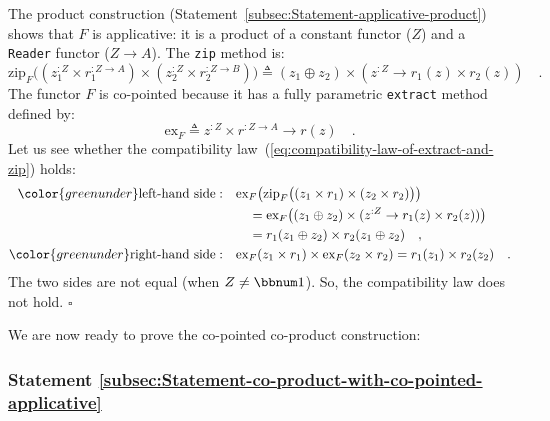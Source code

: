 The product construction (Statement~\ref{subsec:Statement-applicative-product})
shows that $F$ is applicative: it is a product of a constant functor
($Z$) and a \lstinline!Reader! functor ($Z\rightarrow A$). The
\lstinline!zip! method is:
\[
\text{zip}_{F}\big((z_{1}^{:Z}\times r_{1}^{:Z\rightarrow A})\times(z_{2}^{:Z}\times r_{2}^{:Z\rightarrow B})\big)\triangleq(z_{1}\oplus z_{2})\times(z^{:Z}\rightarrow r_{1}(z)\times r_{2}(z))\quad.
\]
 The functor $F$ is co-pointed because it has a fully parametric
\lstinline!extract! method defined by: 
\[
\text{ex}_{F}\triangleq z^{:Z}\times r^{:Z\rightarrow A}\rightarrow r(z)\quad.
\]
Let us see whether the compatibility law~(\ref{eq:compatibility-law-of-extract-and-zip})
holds:
\begin{align*}
{\color{greenunder}\text{left-hand side}:}\quad & \text{ex}_{F}\big(\text{zip}_{F}\big((z_{1}\times r_{1})\times(z_{2}\times r_{2})\big)\big)\\
 & \quad=\text{ex}_{F}\big((z_{1}\oplus z_{2})\times(z^{:Z}\rightarrow r_{1}(z)\times r_{2}(z))\big)\\
 & \quad=r_{1}(z_{1}\oplus z_{2})\times r_{2}(z_{1}\oplus z_{2})\quad,\\
{\color{greenunder}\text{right-hand side}:}\quad & \text{ex}_{F}(z_{1}\times r_{1})\times\text{ex}_{F}(z_{2}\times r_{2})=r_{1}(z_{1})\times r_{2}(z_{2})\quad.
\end{align*}
The two sides are not equal (when $Z\neq\bbnum 1$). So, the compatibility
law does not hold. $\square$

We are now ready to prove the co-pointed co-product construction:

\subsubsection{Statement \label{subsec:Statement-co-product-with-co-pointed-applicative}\ref{subsec:Statement-co-product-with-co-pointed-applicative}}

